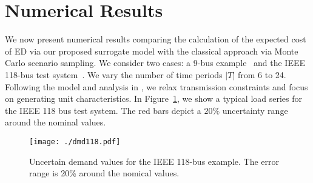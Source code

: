 \documentclass[conference]{IEEEtran}
\begin{document}
\section{Numerical Results}
\label{sec:results}

We now present numerical results comparing the calculation of the 
expected cost of ED via our proposed surrogate model with the
classical approach via Monte Carlo scenario sampling. We consider
two cases: a 9-bus example~\cite{Chow:1982} and the IEEE 118-bus
test system~\cite{IEEEdata}. We vary the number of time periods $|T|$
from 6 to 24. Following the model and analysis in \cite{carrionarroyo06}, 
we relax transmission constraints and focus on generating unit characteristics.
In Figure~\ref{fig:dmd}, we show a typical load series for the IEEE 118 
bus test system. The red bars depict a $20\%$ uncertainty range around 
the nominal values.

\begin{figure}[h]
\centering 
\texttt{[image: ./dmd118.pdf]} \\
\caption{\label{fig:dmd} Uncertain demand values for the IEEE 118-bus
  example. The error range is 20\% around the nomical values.}
\end{figure}
\end{document}

